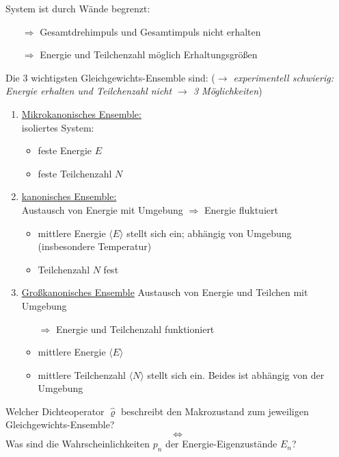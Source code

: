 System ist durch Wände begrenzt:
\begin{itemize}
    \item[$\Rightarrow$] Gesamtdrehimpuls und Gesamtimpuls nicht erhalten
    \item[$\Rightarrow$] Energie und Teilchenzahl möglich Erhaltungsgrößen
\end{itemize}

Die 3 wichtigsten Gleichgewichts-Ensemble sind: (\emph{$\rightarrow$ experimentell schwierig: Energie erhalten und Teilchenzahl nicht $\rightarrow$ 3 Möglichkeiten})

\begin{enumerate}
    \item \underline{Mikrokanonisches Ensemble:} \\
    isoliertes System:
    \begin{itemize}
        \item feste Energie $E$
        \item feste Teilchenzahl $N$
    \end{itemize}
    \item \underline{kanonisches Ensemble:} \\
    Austausch von Energie mit Umgebung $\Rightarrow$ Energie fluktuiert
    \begin{itemize}
        \item mittlere Energie $\langle E \rangle$ stellt sich ein; abhängig von Umgebung (insbesondere Temperatur)
        \item Teilchenzahl $N$ fest
    \end{itemize}
    \item \underline{Großkanonisches Ensemble}
    Austausch von Energie und Teilchen mit Umgebung
    \begin{itemize}
        \item[$\Rightarrow$] Energie und Teilchenzahl funktioniert
        \item mittlere Energie $\langle E \rangle$
        \item mittlere Teilchenzahl $\langle N \rangle$ stellt sich ein. Beides ist abhängig von der Umgebung
    \end{itemize}
\end{enumerate}

Welcher Dichteoperator $\hat{\varrho}$ beschreibt den Makrozustand zum jeweiligen Gleichgewichts-Ensemble?
\begin{equation*}
    \Longleftrightarrow
\end{equation*}
Was sind die Wahrscheinlichkeiten $p_n$ der Energie-Eigenzustände $E_n$?

